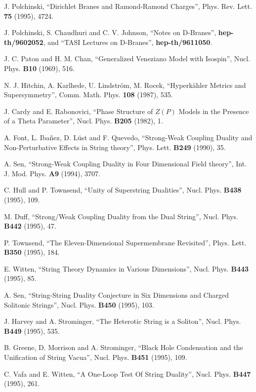 \begin{thebibliography}{99}
  
J. Polchinski, ``Dirichlet Branes and Ramond-Ramond
Charges'', Phys. Rev. Lett. {\bf 75} (1995), 4724.
  
  
J. Polchinski, S. Chaudhuri and C. V.
Johnson, ``Notes on D-Branes'', {\bf hep-th/9602052}, and ``TASI Lectures 
on D-Branes'', {\bf hep-th/9611050}.

 J. C. Paton and H. M. Chan, ``Generalized
Veneziano Model with Isospin'', Nucl. Phys. {\bf B10} (1969),
516.

 N. J. Hitchin, A. Karlhede, U. Lindstr\"om, M.
Rocek, ``Hyperk\"ahler Metrics and Supersymmetry'', Comm. Math.
Phys. {\bf 108} (1987), 535.

 J. Cardy and E. Rabonovici, ``Phase Structure of $Z(P)$ Models 
in the Presence of a Theta Parameter'', Nucl. Phys. {\bf B205} (1982), 1.

 A. Font, L. Iba\~{n}ez, D. L\"{u}st and F. Quevedo,
``Strong-Weak Coupling Duality and Non-Perturbative Effects in String theory'', 
Phys. Lett. {\bf B249} (1990), 35.

 A. Sen, ``Strong-Weak Coupling Duality in Four 
Dimensional Field theory'', Int. J. Mod. Phys. {\bf A9} (1994), 3707.

 C. Hull and P. Townsend, ``Unity of Superstring 
Dualities'', Nucl. Phys. {\bf B438} (1995), 109.

 M. Duff, ``Strong/Weak Coupling Duality from the Dual String'', 
Nucl. Phys. {\bf B442} (1995), 47.

 P. Townsend, ``The Eleven-Dimensional Supermembrane Revisited'', 
Phys. Lett. {\bf B350} (1995), 184.

 E. Witten, ``String Theory Dynamics in Various
Dimensions'', Nucl. Phys. {\bf B443} (1995), 85. 

 A. Sen, ``String-String Duality Conjecture in Six Dimensions and
Charged Solitonic Strings'', Nucl. Phys. {\bf B450} (1995), 103.

 J. Harvey and A. Strominger, ``The Heterotic String is a Soliton'', 
Nucl. Phys. {\bf B449} (1995), 535.

 B. Greene, D. Morrison and A. Strominger, ``Black Hole Condensation and the
Unification of String Vacua'', Nucl. Phys. {\bf B451} (1995),
109.

 C. Vafa and E. Witten, ``A One-Loop Test Of String Duality'', 
Nucl. Phys. {\bf B447} (1995), 261.


\end{thebibliography}
